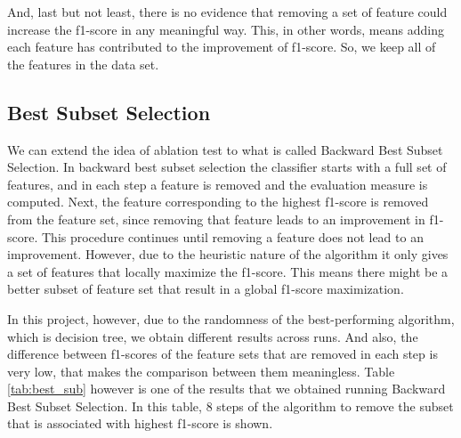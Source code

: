 \documentclass[letterpaper]{article}
\begin{document}
And, last but not least, there is no evidence that removing a set of feature could increase the f1-score in any meaningful way. This, in other words, means adding each feature has contributed to the improvement of f1-score. So, we keep all of the features in the data set.

\subsection{Best Subset Selection}
We can extend the idea of ablation test to what is called Backward Best Subset Selection. In backward best subset selection the classifier starts with a full set of features, and in each step a feature is removed and the evaluation measure is computed. Next, the feature corresponding to the highest f1-score is removed from the feature set, since removing that feature leads to an improvement in f1-score. This procedure continues until removing a feature does not lead to an improvement. However, due to the heuristic nature of the algorithm it only gives a set of features that locally maximize the f1-score. This means there might be a better subset of feature set that result in a global f1-score maximization. 

In this project, however, due to the randomness of the best-performing algorithm, which is decision tree, we obtain different results across runs. And also, the difference between f1-scores of the feature sets that are removed in each step is very low, that makes the comparison between them meaningless. Table \ref{tab:best_sub} however is one of the results that we obtained running Backward Best Subset Selection. In this table, 8 steps of the algorithm to remove the subset that is associated with highest f1-score is shown. 
\end{document}
